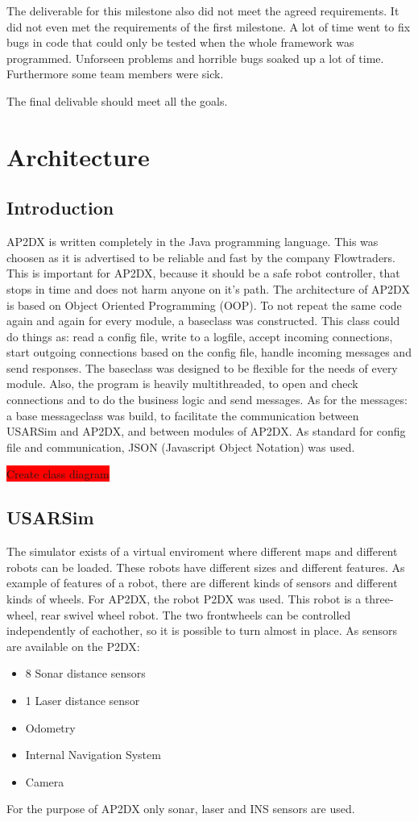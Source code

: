 \documentclass[titlepage, a4paper,10pt]{article}
\newcommand{\todo}[1]{\colorbox{red}{\color{white}#1}}
\begin{document}
The deliverable for this milestone also did not meet the agreed requirements. It
did not even met the requirements of the first milestone. A lot of time went to
fix bugs in code that could only be tested when the whole framework was programmed.
Unforseen problems and horrible bugs soaked up a lot of time. Furthermore some
team members were sick.  

The final delivable should meet all the goals. 

\newpage

\section{Architecture}
\subsection{Introduction}
AP2DX is written completely in the Java programming language. 
This was choosen as it is advertised to be reliable and fast by the company Flowtraders. This is important for AP2DX, because it should be a safe robot controller, that stops in time and does not harm anyone on it's path. The architecture of AP2DX is based on Object Oriented Programming (OOP). 
To not repeat the same code again and again for every module, a baseclass was constructed. 
This class could do things as: read a config file, write to a logfile, accept incoming connections, start outgoing connections based on the config file, handle incoming messages and send responses. 
The baseclass was designed to be flexible for the needs of every module. Also, the program is heavily multithreaded, to open and check connections and to do the business logic and send messages. As for the messages: a base messageclass was build, to facilitate the communication between USARSim and AP2DX, and between modules of AP2DX. As standard for config file and communication, JSON (Javascript Object Notation) was used. 

\todo{Create class diagram}

\subsection{USARSim}
The simulator exists of a virtual enviroment where different maps and different robots can be loaded. These robots have different sizes and different features. As example of features of a robot, there are different kinds of sensors and different kinds of wheels. For AP2DX, the robot P2DX was used. This robot is a three-wheel, rear swivel wheel robot. The two frontwheels can be controlled independently of eachother, so it is possible to turn almost in place. As sensors are available on the P2DX:
\begin{itemize}
\item 8 Sonar distance sensors
\item 1 Laser distance sensor
\item Odometry
\item Internal Navigation System
\item Camera
\end{itemize}
For the purpose of AP2DX only sonar, laser and INS sensors are used.
\end{document}
